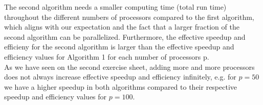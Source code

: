 \documentclass{article}
\begin{document}
\begin{enumerate}[label=(\alph*)]
The second algorithm needs a smaller computing time (total run time) throughout the different numbers of processors compared to the first algorithm, which aligns with our expectation and the fact that a larger fraction of the second algorithm can be parallelized. Furthermore, the effective speedup and efficieny for the second algorithm is larger than the effective speedup and efficiency values for Algorithm 1 for each number of processors p.\\
As we have seen on the second exercise sheet, adding more and more processors does not always increase effective speedup and efficiency infinitely, e.g. for $p=50$ we have a higher speedup in both algorithms compared to their respective speedup and efficiency values for $p=100$.
\end{enumerate} 
\end{document}
